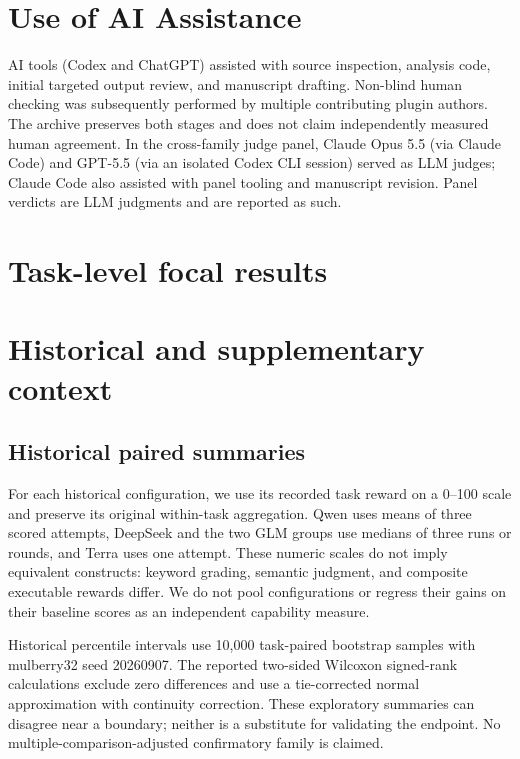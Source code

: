 \documentclass[11pt]{article}
\begin{document}
\section*{Use of AI Assistance}
AI tools (Codex and ChatGPT) assisted with source inspection, analysis code, initial targeted output review, and manuscript drafting. Non-blind human checking was subsequently performed by multiple contributing plugin authors. The archive preserves both stages and does not claim independently measured human agreement. In the cross-family judge panel, Claude Opus 5.5 (via Claude Code) and GPT-5.5 (via an isolated Codex CLI session) served as LLM judges; Claude Code also assisted with panel tooling and manuscript revision. Panel verdicts are LLM judgments and are reported as such.



\appendix
\clearpage
\section{Task-level focal results}


\section{Historical and supplementary context}\label{app:historical}
\subsection{Historical paired summaries}\label{sec:paired}
For each historical configuration, we use its recorded task reward on a 0--100 scale and preserve its original within-task aggregation. Qwen uses means of three scored attempts, DeepSeek and the two GLM groups use medians of three runs or rounds, and Terra uses one attempt. These numeric scales do not imply equivalent constructs: keyword grading, semantic judgment, and composite executable rewards differ. We do not pool configurations or regress their gains on their baseline scores as an independent capability measure.

Historical percentile intervals use 10,000 task-paired bootstrap samples with mulberry32 seed 20260907. The reported two-sided Wilcoxon signed-rank calculations exclude zero differences and use a tie-corrected normal approximation with continuity correction. These exploratory summaries can disagree near a boundary; neither is a substitute for validating the endpoint. No multiple-comparison-adjusted confirmatory family is claimed.
\end{document}
